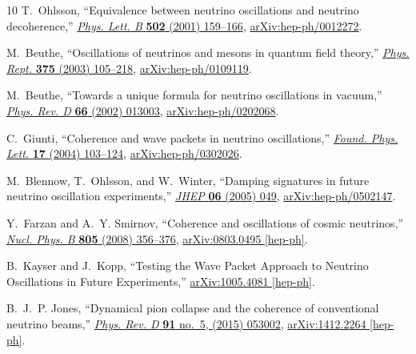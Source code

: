 \documentclass[aps, prd, onecolumn, tightenlines, notitlepage, superscriptaddress, nofootinbib, preprintnumbers, floatfix,showkeys,11pt]{revtex4-2}
\begin{document}
\begin{thebibliography}{10}
T.~Ohlsson, ``{Equivalence between neutrino oscillations and neutrino
  decoherence},'' \href{http://dx.doi.org/10.1016/S0370-2693(01)00178-2}{{\em
  Phys. Lett. B} {\bfseries 502} (2001) 159--166},
  \href{http://arxiv.org/abs/hep-ph/0012272}{{\ttfamily arXiv:hep-ph/0012272}}.

M.~Beuthe, ``{Oscillations of neutrinos and mesons in quantum field theory},''
  \href{http://dx.doi.org/10.1016/S0370-1573(02)00538-0}{{\em Phys. Rept.}
  {\bfseries 375} (2003) 105--218},
  \href{http://arxiv.org/abs/hep-ph/0109119}{{\ttfamily arXiv:hep-ph/0109119}}.

M.~Beuthe, ``{Towards a unique formula for neutrino oscillations in vacuum},''
  \href{http://dx.doi.org/10.1103/PhysRevD.66.013003}{{\em Phys. Rev. D}
  {\bfseries 66} (2002) 013003},
  \href{http://arxiv.org/abs/hep-ph/0202068}{{\ttfamily arXiv:hep-ph/0202068}}.

C.~Giunti, ``{Coherence and wave packets in neutrino oscillations},''
  \href{http://dx.doi.org/10.1023/B:FOPL.0000019651.53280.31}{{\em Found. Phys.
  Lett.} {\bfseries 17} (2004) 103--124},
  \href{http://arxiv.org/abs/hep-ph/0302026}{{\ttfamily arXiv:hep-ph/0302026}}.

M.~Blennow, T.~Ohlsson, and W.~Winter, ``{Damping signatures in future neutrino
  oscillation experiments},''
  \href{http://dx.doi.org/10.1088/1126-6708/2005/06/049}{{\em JHEP} {\bfseries
  06} (2005) 049}, \href{http://arxiv.org/abs/hep-ph/0502147}{{\ttfamily
  arXiv:hep-ph/0502147}}.

Y.~Farzan and A.~Y. Smirnov, ``{Coherence and oscillations of cosmic
  neutrinos},'' \href{http://dx.doi.org/10.1016/j.nuclphysb.2008.07.028}{{\em
  Nucl. Phys. B} {\bfseries 805} (2008) 356--376},
  \href{http://arxiv.org/abs/0803.0495}{{\ttfamily arXiv:0803.0495 [hep-ph]}}.

B.~Kayser and J.~Kopp, ``{Testing the Wave Packet Approach to Neutrino
  Oscillations in Future Experiments},''
  \href{http://arxiv.org/abs/1005.4081}{{\ttfamily arXiv:1005.4081 [hep-ph]}}.

B.~J.~P. Jones, ``{Dynamical pion collapse and the coherence of conventional
  neutrino beams},'' \href{http://dx.doi.org/10.1103/PhysRevD.91.053002}{{\em
  Phys. Rev. D} {\bfseries 91} no.~5, (2015) 053002},
  \href{http://arxiv.org/abs/1412.2264}{{\ttfamily arXiv:1412.2264 [hep-ph]}}.


\end{thebibliography}
\end{document}
